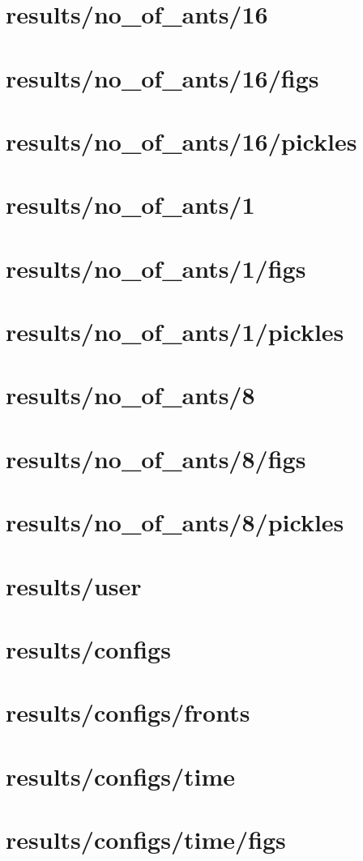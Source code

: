 \section{results/no_of_ants/16}
\section{results/no_of_ants/16/figs}
\section{results/no_of_ants/16/pickles}
\section{results/no_of_ants/1}
\section{results/no_of_ants/1/figs}
\section{results/no_of_ants/1/pickles}
\section{results/no_of_ants/8}
\section{results/no_of_ants/8/figs}
\section{results/no_of_ants/8/pickles}
\section{results/user}
\section{results/configs}
\section{results/configs/fronts}
\section{results/configs/time}
\section{results/configs/time/figs}

